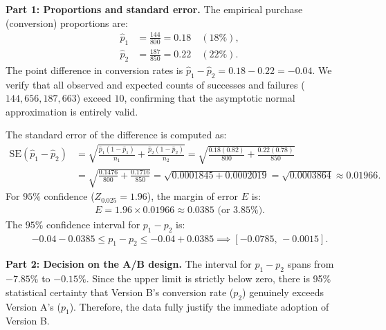 \begin{solucion}
	\textbf{Part 1: Proportions and standard error.}
	The empirical purchase (conversion) proportions are:
	\begin{align}
		\hat{p}_1 &= \frac{144}{800} = 0.18 \quad (18\%), \\
		\hat{p}_2 &= \frac{187}{850} = 0.22 \quad (22\%).
	\end{align}
	The point difference in conversion rates is $\hat{p}_1 - \hat{p}_2 = 0.18 - 0.22 = -0.04$. We verify that all observed and expected counts of successes and failures ($144, 656, 187, 663$) exceed $10$, confirming that the asymptotic normal approximation is entirely valid.
	
	The standard error of the difference is computed as:
	\begin{align}
		\text{SE}(\hat{p}_1 - \hat{p}_2) &= \sqrt{\frac{\hat{p}_1(1-\hat{p}_1)}{n_1} + \frac{\hat{p}_2(1-\hat{p}_2)}{n_2}} = \sqrt{\frac{0.18(0.82)}{800} + \frac{0.22(0.78)}{850}} \\
		&= \sqrt{\frac{0.1476}{800} + \frac{0.1716}{850}} = \sqrt{0.0001845 + 0.0002019} = \sqrt{0.0003864} \approx 0.01966.
	\end{align}
	For $95\%$ confidence ($Z_{0.025} = 1.96$), the margin of error $E$ is:
	\begin{align}
		E = 1.96 \times 0.01966 \approx 0.0385 \text{ (or 3.85\%).}
	\end{align}
	The $95\%$ confidence interval for $p_1 - p_2$ is:
	\begin{align}
		-0.04 - 0.0385 \le p_1 - p_2 \le -0.04 + 0.0385 \implies [-0.0785, \, -0.0015].
	\end{align}
	
	\textbf{Part 2: Decision on the A/B design.}
	The interval for $p_1 - p_2$ spans from $-7.85\%$ to $-0.15\%$. Since the upper limit is strictly below zero, there is 95\% statistical certainty that Version B's conversion rate ($p_2$) genuinely exceeds Version A's ($p_1$). Therefore, the data fully justify the immediate adoption of Version B.
\end{solucion}


